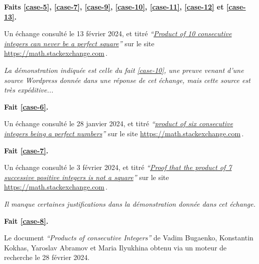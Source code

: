 

\bigskip
\textbf{Faits \ref{case-5}, \ref{case-7}, \ref{case-9}, \ref{case-10}, \ref{case-11}, \ref{case-12} et \ref{case-13}.}
	
\smallskip
\noindent
Un échange consulté le 13 février 2024, et titré
\emph{\enquote{\href{https://math.stackexchange.com/q/2361670/52365}{Product of 10 consecutive integers can never be a perfect square}}} 
sur le site \url{https://math.stackexchange.com}\,.

\smallskip
\noindent
\emph{La démonstration indiquée est celle du fait \ref{case-10}, une preuve venant d'une source Wordpress donnée dans une réponse de cet échange, mais cette source est très expéditive...}




\bigskip
\textbf{Fait \ref{case-6}.}
	
\smallskip
\noindent
Un échange consulté le 28 janvier 2024, et titré
\emph{\enquote{\href{https://math.stackexchange.com/q/90894/52365}{product of six consecutive integers being a perfect numbers}}} 
sur le site \url{https://math.stackexchange.com}\,.




\bigskip
\textbf{Fait \ref{case-7}.}
	
\smallskip
\noindent
Un échange consulté le 3 février 2024, et titré
\emph{\enquote{\href{https://math.stackexchange.com/q/2334887/52365}{Proof that the product of 7 successive positive integers is not a square}}} 
sur le site \url{https://math.stackexchange.com}\,.
	
\smallskip
\noindent
\emph{Il manque certaines justifications dans la démonstration donnée dans cet échange.}




\bigskip
\textbf{Fait \ref{case-8}.}
	
\smallskip
\noindent
Le document \emph{\enquote{Products of consecutive Integers}} de Vadim Bugaenko, Konstantin Kokhas, Yaroslav Abramov et Maria Ilyukhina obtenu via un moteur de recherche le 28 février 2024.



